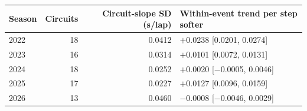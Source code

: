 \begin{tabular}{@{}lrrl@{}}
\toprule
Season & Circuits & Circuit-slope SD (s/lap) & Within-event trend per step softer \\
\midrule
2022 & 18 & 0.0412 & \ensuremath{+}0.0238 [0.0201, 0.0274] \\
2023 & 16 & 0.0314 & \ensuremath{+}0.0101 [0.0072, 0.0131] \\
2024 & 18 & 0.0252 & \ensuremath{+}0.0020 [\ensuremath{-}0.0005, 0.0046] \\
2025 & 17 & 0.0227 & \ensuremath{+}0.0127 [0.0096, 0.0159] \\
2026 & 13 & 0.0460 & \ensuremath{-}0.0008 [\ensuremath{-}0.0046, 0.0029] \\
\bottomrule
\end{tabular}
